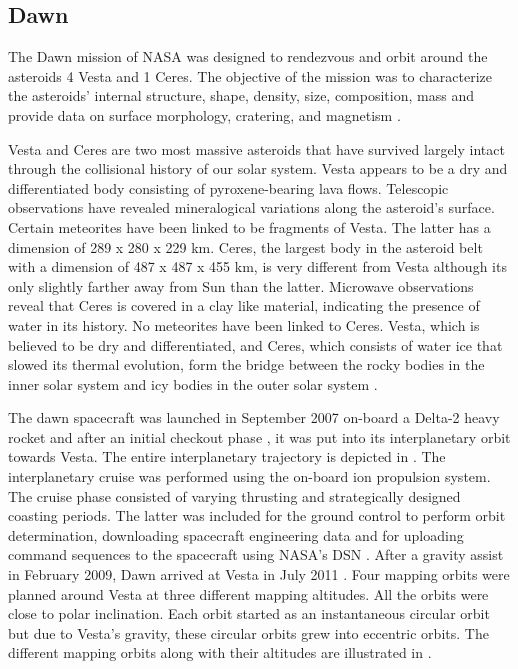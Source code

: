 \subsection{Dawn}
\label{dawn}
The Dawn mission of \gls{NASA} was designed to rendezvous and orbit around the asteroids 4 Vesta and 1 Ceres. The objective of the mission was to characterize the asteroids' internal structure, shape, density, size, composition, mass and provide data on surface morphology, cratering, and magnetism \cite{dawnnssdc}.

Vesta and Ceres are two most massive asteroids that have survived largely intact through the collisional history of our solar system. Vesta appears to be a dry and differentiated body consisting of pyroxene-bearing lava flows. Telescopic observations have revealed mineralogical variations along the asteroid's surface. Certain meteorites have been linked to be fragments of Vesta. The latter has a dimension of 289 x 280 x 229 km. Ceres, the largest body in the asteroid belt with a dimension of 487 x 487 x 455 km, is very different from Vesta although its only slightly farther away from Sun than the latter. Microwave observations reveal that Ceres is covered in a clay like material, indicating the presence of water in its history. No meteorites have been linked to Ceres. Vesta, which is believed to be dry and differentiated, and Ceres, which consists of water ice that slowed its thermal evolution, form the bridge between the rocky bodies in the inner solar system and icy bodies in the outer solar system \cite{dawnelsevier}.

The dawn spacecraft was launched in September 2007 on-board a Delta-2 heavy rocket and after an initial checkout phase \cite{vestaorbits}, it was put into its interplanetary orbit towards Vesta. The entire interplanetary trajectory is depicted in . The interplanetary cruise was performed using the on-board ion propulsion system. The cruise phase consisted of varying thrusting and strategically designed coasting periods. The latter was included for the ground control to perform orbit determination, downloading spacecraft engineering data and for uploading command sequences to the spacecraft using \gls{NASA}'s \gls{DSN} \cite{dawninter}. After a gravity assist in February 2009, Dawn arrived at Vesta in July 2011 \cite{dawninter}. Four mapping orbits were planned around Vesta at three different mapping altitudes. All the orbits were close to polar inclination. Each orbit started as an instantaneous circular orbit but due to Vesta's gravity, these circular orbits grew into eccentric orbits. The different mapping orbits along with their altitudes are illustrated in  \cite{vestaorbits}.

